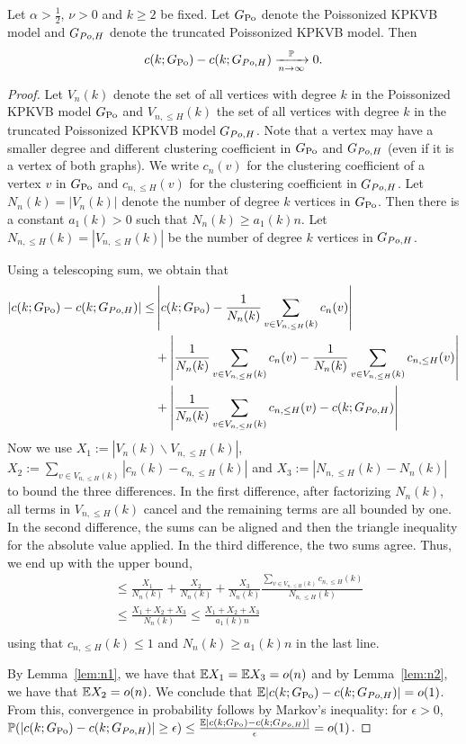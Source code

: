 \begin{lemma}\label{lem:trunc}
Let $\alpha>\frac{1}{2}$, $\nu>0$ and $k \geq 2$ be fixed. Let $G_{\text{Po}}$ denote the Poissonized KPKVB model and $G_{Po,H}$ denote the truncated Poissonized KPKVB model. Then 
$$c(k;G_{\text{Po}})-c(k;G_{Po,H}) \xrightarrow[n \rightarrow \infty]{\mathbb{P}} 0.$$
\end{lemma}
\begin{proof}
Let $V_n(k)$ denote the set of all vertices with degree $k$ in the Poissonized KPKVB model $G_{\text{Po}}$ and $V_{n,\leq H}(k)$ the set of all vertices with degree $k$ in the truncated Poissonized KPKVB model $G_{Po,H}$. Note that a vertex may have a smaller degree and different clustering coefficient in $G_{\text{Po}}$ and $G_{Po,H}$ (even if it is a vertex of both graphs). We write $c_n(v)$ for the clustering coefficient of a vertex $v$ in $G_{\text{Po}}$ and $c_{n,\leq H}(v)$ for the clustering coefficient in $G_{Po,H}$. Let $N_n(k)=|V_n(k)|$ denote the number of degree $k$ vertices in $G_{\text{Po}}$. Then there is a constant $a_1(k)>0$ such that $N_n(k) \geq a_1(k) n$. Let $N_{n,\leq H}(k) = |V_{n,\leq H}(k)|$ be the number of degree $k$ vertices in $G_{Po,H}$.

Using a telescoping sum, we obtain that
\begin{align*}
|c(k;G_{\text{Po}})-c(k;G_{Po,H})| \leq & \left|c(k;G_{\text{Po}})-\frac{1}{N_n(k)}\sum_{v \in V_{n,\leq H}(k)} c_n(v)\right|\\
&+\left|\frac{1}{N_n(k)}\sum_{v \in V_{n,\leq H}(k)} c_n(v) -\frac{1}{N_n(k)}\sum_{v \in V_{n,\leq H}(k)}c_{n,\leq H}(v)\right| \\
&+\left|\frac{1}{N_n(k)}\sum_{v \in V_{n,\leq H}(k)} c_{n,\leq H}(v)-c(k;G_{Po,H})\right| 
\end{align*}
Now we use $X_1 := |V_n(k)\backslash V_{n,\leq H}(k)|$, $X_2 := \sum_{v \in V_{n,\leq H}(k)}|c_n(k)-c_{n,\leq H}(k)|$ and $X_3 :=|N_{n,\leq H}(k)-N_n(k)|$ to bound the three differences. In the first difference, after factorizing $N_n(k)$, all terms in $V_{n,\leq H}(k)$ cancel and the remaining terms are all bounded by one. In the second difference, the sums can be aligned and then the triangle inequality for the absolute value applied. In the third difference, the two sums agree. Thus, we end up with the upper bound,
\begin{align*}
&\leq \frac{X_1}{N_n(k)}+\frac{X_2}{N_n(k)}+\frac{X_3}{N_n(k)}\frac{\sum_{v \in V_{n,\leq H}(k)}c_{n,\leq H}(k)}{N_{n,\leq H}(k)} \\
&\leq \frac{X_1+X_2+X_3}{N_n(k)} \leq \frac{X_1+X_2+X_3}{a_1(k)n} \\
\end{align*}
using that $c_{n,\leq H}(k) \leq 1$ and $N_n(k) \geq a_1(k)n$ in the last line.

By Lemma~\ref{lem:n1}, we have that $\mathbb{E} X_1 = \mathbb{E} X_3 = o(n)$ and by Lemma~\ref{lem:n2}, we have that $\mathbb{E} X_2 = o(n)$. We conclude that $\mathbb{E} |c(k;G_{\text{Po}})-c(k;G_{Po,H})| = o(1)$. From this, convergence in probability follows by Markov's inequality: for $\epsilon >0$, $\mathbb{P}(|c(k;G_{\text{Po}})-c(k;G_{Po,H})| \geq \epsilon) \leq \frac{\mathbb{E}|c(k;G_{\text{Po}})-c(k;G_{Po,H})|}{\epsilon} = o(1)$.
\end{proof}

